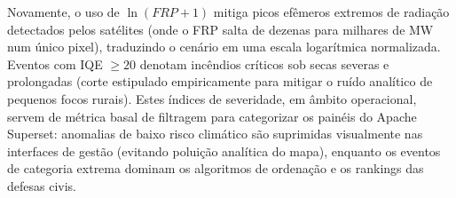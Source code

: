 Novamente, o uso de $\ln(FRP+1)$ mitiga picos efêmeros extremos de radiação detectados pelos satélites (onde o FRP salta de dezenas para milhares de MW num único pixel), traduzindo o cenário em uma escala logarítmica normalizada. Eventos com IQE $\geq 20$ denotam incêndios críticos sob secas severas e prolongadas (corte estipulado empiricamente para mitigar o ruído analítico de pequenos focos rurais). Estes índices de severidade, em âmbito operacional, servem de métrica basal de filtragem para categorizar os painéis do Apache Superset: anomalias de baixo risco climático são suprimidas visualmente nas interfaces de gestão (evitando poluição analítica do mapa), enquanto os eventos de categoria extrema dominam os algoritmos de ordenação e os rankings das defesas civis.
